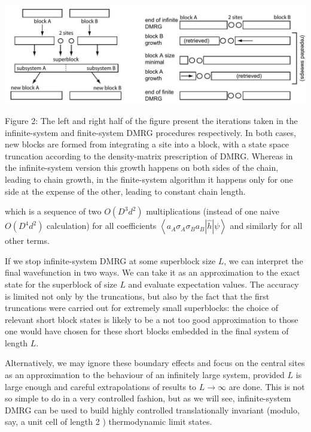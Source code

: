 \documentclass[12pt]{article}
\begin{document}
\begin{center}
\includegraphics[max width=\textwidth]{2024_05_04_afc4ad226da9ccfe0ac8g-011}
\end{center}

Figure 2: The left and right half of the figure present the iterations taken in the infinite-system and finite-system DMRG procedures respectively. In both cases, new blocks are formed from integrating a site into a block, with a state space truncation according to the density-matrix prescription of DMRG. Whereas in the infinite-system version this growth happens on both sides of the chain, leading to chain growth, in the finite-system algorithm it happens only for one side at the expense of the other, leading to constant chain length.

which is a sequence of two $O\left(D^{3} d^{2}\right)$ multiplications (instead of one naive $O\left(D^{4} d^{2}\right)$ calculation) for all coefficients $\left\langle a_{A} \sigma_{A} \sigma_{B} a_{B}|\hat{h}| \psi\right\rangle$ and similarly for all other terms.

If we stop infinite-system DMRG at some superblock size $L$, we can interpret the final wavefunction in two ways. We can take it as an approximation to the exact state for the superblock of size $L$ and evaluate expectation values. The accuracy is limited not only by the truncations, but also by the fact that the first truncations were carried out for extremely small superblocks: the choice of relevant short block states is likely to be a not too good approximation to those one would have chosen for these short blocks embedded in the final system of length $L$.

Alternatively, we may ignore these boundary effects and focus on the central sites as an approximation to the behaviour of an infinitely large system, provided $L$ is large enough and careful extrapolations of results to $L \rightarrow \infty$ are done. This is not so simple to do in a very controlled fashion, but as we will see, infinite-system DMRG can be used to build highly controlled translationally invariant (modulo, say, a unit cell of length 2 ) thermodynamic limit states.
\end{document}
